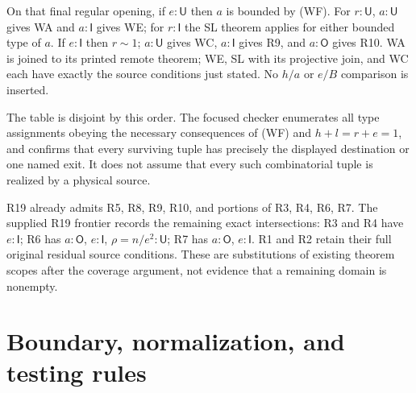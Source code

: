 \documentclass[11pt]{article}
\newcommand{\I}{\mathsf I}
\newcommand{\U}{\mathsf U}
\newcommand{\Otype}{\mathsf O}
\begin{document}
On that final regular opening, if $e:\U$ then $a$ is bounded by
(WF). For $r:\U$, $a:\U$ gives WA and $a:\I$ gives WE; for
$r:\I$ the SL theorem applies for either bounded type of $a$.
If $e:\I$ then $r\sim1$; $a:\U$ gives WC, $a:\I$ gives R9,
and $a:\Otype$ gives R10. WA is joined to its printed remote theorem;
WE, SL with its projective join, and WC each have exactly the source
conditions just stated. No $h/a$ or $e/B$ comparison is inserted.

The table is disjoint by this order. The focused checker enumerates
all type assignments obeying the necessary consequences of (WF) and
$h+l=r+e=1$, and confirms that every surviving tuple has precisely
the displayed destination or one named exit. It does not assume that
every such combinatorial tuple is realized by a physical source.

R19 already admits R5, R8, R9, R10, and portions of R3, R4, R6, R7.
The supplied R19 frontier records the remaining exact intersections:
R3 and R4 have $e:\I$; R6 has $a:\Otype$, $e:\I$,
$\rho=n/e^2:\U$; R7 has $a:\Otype$, $e:\I$.
R1 and R2 retain their full original residual source conditions.
These are substitutions of existing theorem scopes after the coverage
argument, not evidence that a remaining domain is nonempty.

\section{Boundary, normalization, and testing rules}
\end{document}
